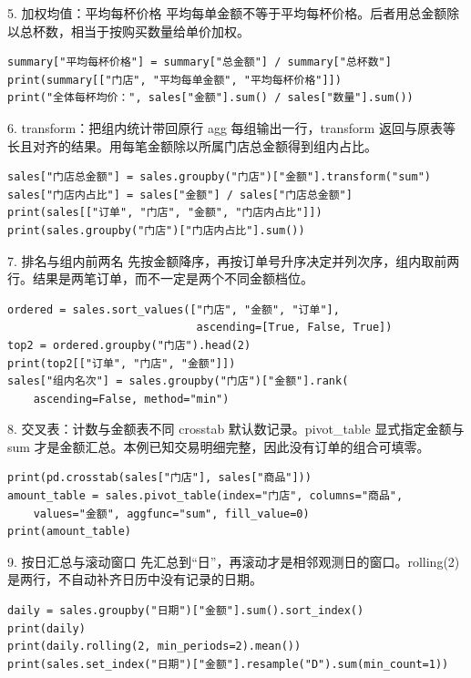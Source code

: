 \begin{frame}[fragile]{5. 加权均值：平均每杯价格}
\small 平均每单金额不等于平均每杯价格。后者用总金额除以总杯数，相当于按购买数量给单价加权。
\medskip
\begin{lstlisting}
summary["平均每杯价格"] = summary["总金额"] / summary["总杯数"]
print(summary[["门店", "平均每单金额", "平均每杯价格"]])
print("全体每杯均价：", sales["金额"].sum() / sales["数量"].sum())
\end{lstlisting}
\end{frame}

\begin{frame}[fragile]{6. transform：把组内统计带回原行}
\small agg 每组输出一行，transform 返回与原表等长且对齐的结果。用每笔金额除以所属门店总金额得到组内占比。
\medskip
\begin{lstlisting}
sales["门店总金额"] = sales.groupby("门店")["金额"].transform("sum")
sales["门店内占比"] = sales["金额"] / sales["门店总金额"]
print(sales[["订单", "门店", "金额", "门店内占比"]])
print(sales.groupby("门店")["门店内占比"].sum())
\end{lstlisting}
\end{frame}

\begin{frame}[fragile]{7. 排名与组内前两名}
\small 先按金额降序，再按订单号升序决定并列次序，组内取前两行。结果是两笔订单，而不一定是两个不同金额档位。
\medskip
\begin{lstlisting}
ordered = sales.sort_values(["门店", "金额", "订单"],
                             ascending=[True, False, True])
top2 = ordered.groupby("门店").head(2)
print(top2[["订单", "门店", "金额"]])
sales["组内名次"] = sales.groupby("门店")["金额"].rank(
    ascending=False, method="min")
\end{lstlisting}
\end{frame}

\begin{frame}[fragile]{8. 交叉表：计数与金额表不同}
\small crosstab 默认数记录。pivot\_table 显式指定金额与 sum 才是金额汇总。本例已知交易明细完整，因此没有订单的组合可填零。
\medskip
\begin{lstlisting}
print(pd.crosstab(sales["门店"], sales["商品"]))
amount_table = sales.pivot_table(index="门店", columns="商品",
    values="金额", aggfunc="sum", fill_value=0)
print(amount_table)
\end{lstlisting}
\end{frame}

\begin{frame}[fragile]{9. 按日汇总与滚动窗口}
\small 先汇总到“日”，再滚动才是相邻观测日的窗口。rolling(2) 是两行，不自动补齐日历中没有记录的日期。
\medskip
\begin{lstlisting}
daily = sales.groupby("日期")["金额"].sum().sort_index()
print(daily)
print(daily.rolling(2, min_periods=2).mean())
print(sales.set_index("日期")["金额"].resample("D").sum(min_count=1))
\end{lstlisting}
\end{frame}

